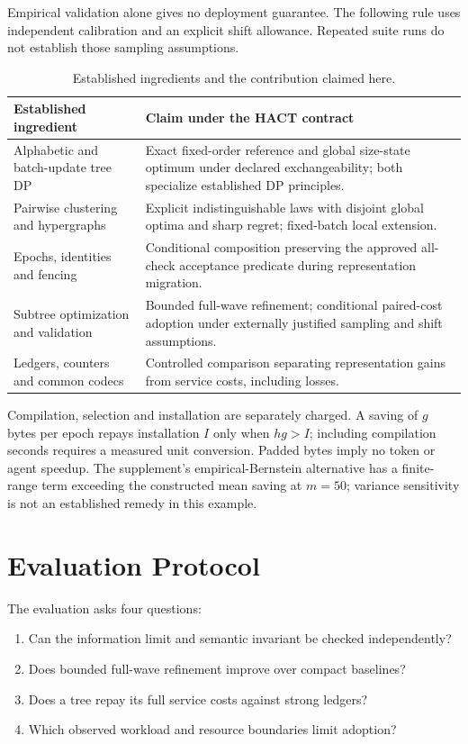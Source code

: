 \documentclass[10pt,journal,compsoc]{IEEEtran}
\theoremstyle{definition}\newtheorem{definition}[theorem]{Definition}
\begin{document}
Empirical validation alone gives no deployment guarantee. The following
rule uses independent calibration and an explicit shift allowance.
Repeated suite runs do not establish those sampling assumptions.



\begin{table}[t]\centering\footnotesize
\caption{Established ingredients and the contribution claimed here.}
\label{tab:novelty}
\begin{tabularx}{\columnwidth}{@{}p{}X@{}}\toprule
Established ingredient & Claim under the HACT contract\\\midrule
Alphabetic and batch-update tree DP & Exact fixed-order reference and global size-state optimum under declared exchangeability; both specialize established DP principles.\\
Pairwise clustering and hypergraphs & Explicit indistinguishable laws with disjoint global optima and sharp regret; fixed-batch local extension.\\
Epochs, identities and fencing & Conditional composition preserving the approved all-check acceptance predicate during representation migration.\\
Subtree optimization and validation & Bounded full-wave refinement; conditional paired-cost adoption under externally justified sampling and shift assumptions.\\
Ledgers, counters and common codecs & Controlled comparison separating representation gains from service costs, including losses.\\\bottomrule
\end{tabularx}
\end{table}

Compilation, selection and installation are separately charged. A saving
of $g$ bytes per epoch repays installation $I$ only when $h g>I$; including
compilation seconds requires a measured unit conversion. Padded bytes imply
no token or agent speedup. The supplement's empirical-Bernstein alternative
has a finite-range term exceeding the constructed mean saving at $m=50$;
variance sensitivity is not an established remedy in this example.

\section{Evaluation Protocol}\label{sec:jevaluation}
The evaluation asks four questions:
\begin{enumerate}
\item Can the information limit and semantic invariant be checked independently?
\item Does bounded full-wave refinement improve over compact baselines?
\item Does a tree repay its full service costs against strong ledgers?
\item Which observed workload and resource boundaries limit adoption?
\end{enumerate}
\end{document}
